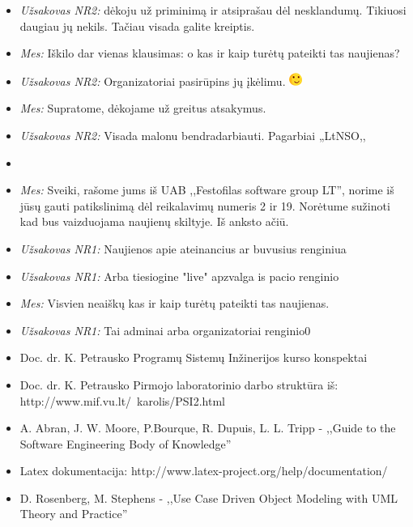 \documentclass{VUMIFPSkursinis}
\begin{document}
\begin{itemize}
\begin{itemize}
						\item \textit{Užsakovas NR2:} dėkoju už priminimą ir atsiprašau dėl nesklandumų. Tikiuosi daugiau jų nekils. Tačiau visada galite kreiptis.
						\item \textit{Mes:} Iškilo dar vienas klausimas: o kas ir kaip turėtų pateikti tas naujienas?
						\item \textit{Užsakovas NR2:} Organizatoriai pasirūpins jų įkėlimu. \includegraphics{img/PSI4/smile.png}
						\item \textit{Mes:} Supratome, dėkojame už greitus atsakymus.
						\item \textit{Užsakovas NR2:} Visada malonu bendradarbiauti. Pagarbiai „LtNSO,,
						\item[ ]
						\item \textit{Mes:} Sveiki, rašome jums iš UAB ,,Festofilas software group LT'', norime iš jūsų gauti patikslinimą dėl reikalavimų numeris 2 ir 19. Norėtume sužinoti kad bus vaizduojama naujienų skiltyje. Iš anksto ačiū.
						\item \textit{Užsakovas NR1:} Naujienos apie ateinancius ar buvusius renginiua
						\item \textit{Užsakovas NR1:} Arba tiesiogine "live" apzvalga is pacio renginio
						\item \textit{Mes:} Visvien neaiškų kas ir kaip turėtų pateikti tas naujienas.
						\item \textit{Užsakovas NR1:} Tai adminai arba organizatoriai renginio0
					\end{itemize}
			\end{itemize}
			
        \begin{itemize}
			\item Doc. dr. K. Petrausko Programų Sistemų Inžinerijos kurso konspektai
			\item Doc. dr. K. Petrausko Pirmojo laboratorinio darbo struktūra iš: http://www.mif.vu.lt/~karolis/PSI2.html
			\item A. Abran, J. W. Moore, P.Bourque, R. Dupuis, L. L. Tripp - ,,Guide to the Software Engineering Body of Knowledge''
			\item Latex dokumentacija: http://www.latex-project.org/help/documentation/
			\item D. Rosenberg, M. Stephens - ,,Use Case Driven Object Modeling with UML Theory and Practice''
        \end{itemize}
\end{document}
